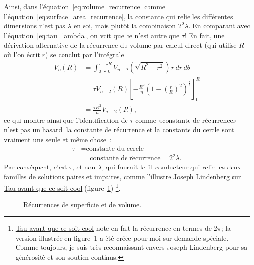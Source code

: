 Ainsi, dans l'équation~\eqref{eq:volume_recurrence} comme
l'équation~\eqref{eq:surface_area_recurrence}, la constante qui
relie les différentes dimensions n'est pas $\lambda$ en soi, mais plutôt la
combinaison $2^2\lambda$. En comparant avec l'équation~\eqref{eq:tau_lambda}, on
voit que ce n'est autre que $\tau$\ns! En fait, une
\href{https://en.wikipedia.org/wiki/Volume_of_an_n-ball#The_two-dimension_recursion_formula}{dérivation
alternative} de la récurrence du volume par calcul direct (qui utilise $R$ où
l'on écrit $r$) se conclut par l'intégrale
\begin{equation}
\label{eq:integral_recurrence}
\begin{split}
V_n(R) & = \int_0^\tau \int_0^R V_{n-2}\left(\sqrt{R^2 - r^2}\right) \,r\,dr\,d\theta \\
       & = \tau V_{n-2}(R) \left[-\frac{R^2}{n}\left(1 - \left(\frac{r}{R}\right)^2\right)^\frac{n}{2}\right]_{0}^{R} \\
       & = \frac{\tau R^2}{n} V_{n-2}(R),
\end{split}
\end{equation}
ce qui montre ainsi que l'identification de $\tau$ comme «\ns constante de
récurrence\ns » n'est pas un hasard\ns; la constante de récurrence et la constante
du cercle sont vraiment une seule et même chose~:
\[
\begin{split}
\tau & = \mbox{constante du cercle} \\
     & = \mbox{constante de}\; \mathrm{r\acute{e}currence} = 2^2\lambda.
\end{split}
\]
Par conséquent, c'est $\tau$, et non $\lambda$, qui fournit le fil conducteur
qui relie les deux familles de solutions paires et impaires, comme l'illustre
Joseph Lindenberg sur
\href{https://translate.google.com/translate?hl=en&sl=en&tl=fr&u=https://sites.google.com/site/taubeforeitwascool/}{Tau
avant que ce soit cool}
(figure~\ref{fig:Nspheres})\ns
\footnote{\href{https://translate.google.com/translate?hl=en&sl=en&tl=fr&u=https://sites.google.com/site/taubeforeitwascool/}{Tau
avant que ce soit cool} note en fait la récurrence en termes de $2\pi$\ns; la
version illustrée en figure~\ref{fig:Nspheres} a été créée pour moi sur
demande spéciale. Comme toujours, je suis très reconnaissant envers Joseph Lindenberg
pour sa générosité et son soutien continus.}.

\begin{figure}
\begin{center}
\end{center}
\caption{Récurrences de superficie et de volume.\label{fig:Nspheres}}
\end{figure}

